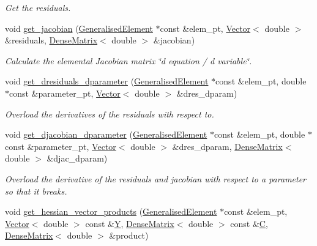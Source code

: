\begin{DoxyCompactItemize}
\begin{DoxyCompactList}\small\item\em Get the residuals. \end{DoxyCompactList}\item 
void \hyperlink{classoomph_1_1PitchForkHandler_aa6728813a099111bee2b6c79dec20fc4}{get\+\_\+jacobian} (\hyperlink{classoomph_1_1GeneralisedElement}{Generalised\+Element} $\ast$const \&elem\+\_\+pt, \hyperlink{classoomph_1_1Vector}{Vector}$<$ double $>$ \&residuals, \hyperlink{classoomph_1_1DenseMatrix}{Dense\+Matrix}$<$ double $>$ \&jacobian)
\begin{DoxyCompactList}\small\item\em Calculate the elemental Jacobian matrix \char`\"{}d equation 
/ d variable\char`\"{}. \end{DoxyCompactList}\item 
void \hyperlink{classoomph_1_1PitchForkHandler_a6510803afcbcfce1ae5b1c1c5d82a541}{get\+\_\+dresiduals\+\_\+dparameter} (\hyperlink{classoomph_1_1GeneralisedElement}{Generalised\+Element} $\ast$const \&elem\+\_\+pt, double $\ast$const \&parameter\+\_\+pt, \hyperlink{classoomph_1_1Vector}{Vector}$<$ double $>$ \&dres\+\_\+dparam)
\begin{DoxyCompactList}\small\item\em Overload the derivatives of the residuals with respect to. \end{DoxyCompactList}\item 
void \hyperlink{classoomph_1_1PitchForkHandler_aa16d6770f6d46b7db4101f417373b191}{get\+\_\+djacobian\+\_\+dparameter} (\hyperlink{classoomph_1_1GeneralisedElement}{Generalised\+Element} $\ast$const \&elem\+\_\+pt, double $\ast$const \&parameter\+\_\+pt, \hyperlink{classoomph_1_1Vector}{Vector}$<$ double $>$ \&dres\+\_\+dparam, \hyperlink{classoomph_1_1DenseMatrix}{Dense\+Matrix}$<$ double $>$ \&djac\+\_\+dparam)
\begin{DoxyCompactList}\small\item\em Overload the derivative of the residuals and jacobian with respect to a parameter so that it breaks. \end{DoxyCompactList}\item 
void \hyperlink{classoomph_1_1PitchForkHandler_a85e7dba2d21c9fe95a575a115cf3ee9f}{get\+\_\+hessian\+\_\+vector\+\_\+products} (\hyperlink{classoomph_1_1GeneralisedElement}{Generalised\+Element} $\ast$const \&elem\+\_\+pt, \hyperlink{classoomph_1_1Vector}{Vector}$<$ double $>$ const \&\hyperlink{classoomph_1_1PitchForkHandler_a289ce15584734b8ea50cd9a7f7f430ed}{Y}, \hyperlink{classoomph_1_1DenseMatrix}{Dense\+Matrix}$<$ double $>$ const \&\hyperlink{classoomph_1_1PitchForkHandler_a88f5df169c44b02f4ba563cf42241599}{C}, \hyperlink{classoomph_1_1DenseMatrix}{Dense\+Matrix}$<$ double $>$ \&product)

\end{DoxyCompactItemize}
